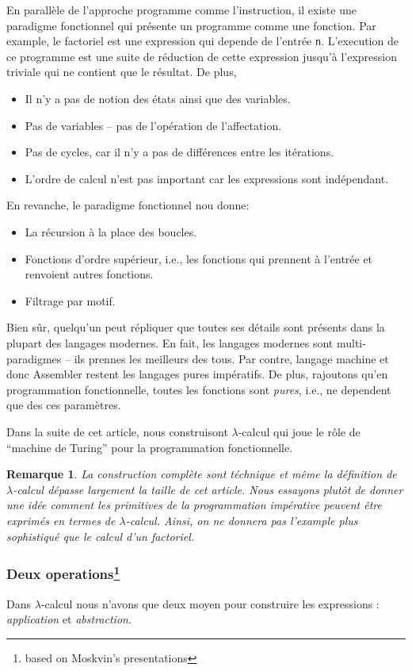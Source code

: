 \documentclass[12pt, a4paper]{article}
\newtheorem*{remark}{Remarque}
\begin{document}
En parallèle de l'approche programme comme l'instruction, il existe une paradigme fonctionnel qui présente un programme comme une fonction.
Par example, le factoriel est une expression qui depende de l'entrée \verb|n|.
L'execution de ce programme est une suite de réduction de cette expression jusqu'à l'expression triviale qui ne contient que le résultat.
De plus,
\begin{itemize}
	\item Il n'y a pas de notion des états ainsi que des variables.
	\item Pas de variables -- pas de l'opération de l'affectation.
	\item Pas de cycles, car il n'y a pas de différences entre les itérations.
	\item L'ordre de calcul n'est pas important car les expressions sont indépendant.
\end{itemize}
En revanche, le paradigme fonctionnel nou donne:
\begin{itemize}
	\item La récursion à la place des boucles.
	\item Fonctions d'ordre supérieur, i.e., les fonctions qui prennent à l'entrée et renvoient autres fonctions.
	\item Filtrage par motif.
\end{itemize}
Bien sûr, quelqu'un peut répliquer que toutes ses détails sont présents dans la plupart des langages modernes.
En fait, les langages modernes sont multi-paradigmes -- ils prennes les meilleurs des tous.
Par contre, langage machine et donc Assembler restent les langages pures impératifs.
De plus, rajoutons qu'en programmation fonctionnelle, toutes les fonctions sont \emph{pures}, i.e., ne dependent que des ces paramètres.

Dans la suite de cet article, nous construisont $\lambda$-calcul qui joue le rôle de ``machine de Turing'' pour la programmation fonctionnelle.
\begin{remark}
	La construction complète sont téchnique et même la définition de $\lambda$-calcul dépasse largement la taille de cet article. Nous essayons plutôt de donner une idée comment les primitives de la programmation impérative peuvent être exprimés en termes de $\lambda$-calcul. Ainsi, on ne donnera pas l'example plus sophistiqué que le calcul d'un factoriel.
\end{remark}

\subsubsection*{Deux operations\footnote{based on Moskvin's presentations}}
Dans $\lambda$-calcul nous n'avons que deux moyen pour construire les expressions : \emph{application} et \emph{abstraction}.
\end{document}
